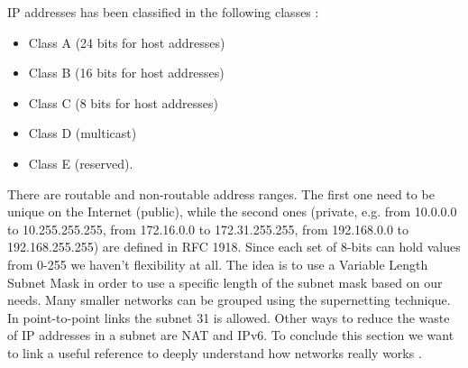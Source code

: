 \documentclass[11pt]{article}
\begin{document}
IP addresses has been classified in the following classes :
\begin{itemize}
\item Class A (24 bits for host addresses)
\item Class B (16 bits for host addresses)
\item Class C (8 bits for host addresses)
\item Class D (multicast)
\item Class E (reserved).
\end{itemize}
There are routable and non-routable address ranges. The first one need to be unique on the Internet (public), while the second ones (private, e.g. from 10.0.0.0 to 10.255.255.255, from 172.16.0.0 to 172.31.255.255, from 192.168.0.0
to 192.168.255.255) are defined in RFC 1918. Since each set of 8-bits can hold values from 0-255 we haven't flexibility at all. The idea is to use a Variable Length Subnet Mask in order to use a specific length of the subnet mask based on our needs. Many smaller networks can be grouped using the supernetting technique. In point-to-point links the subnet 31 is allowed. Other ways to reduce the waste of IP addresses in a subnet are NAT and IPv6. To conclude this section we want to link a useful reference to deeply understand how networks really works \cite{introduction}.
\end{document}
